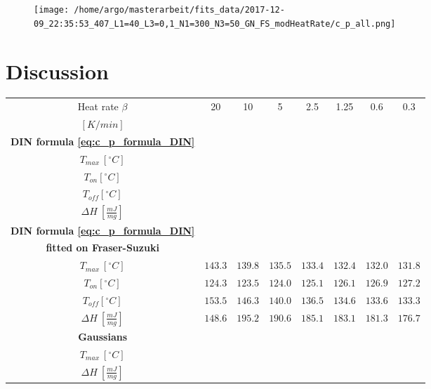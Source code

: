 \documentclass{scrartcl}[12pt, halfparskip]
\numberwithin{equation}{section}
\numberwithin{figure}{section}
\numberwithin{table}{section}
\begin{document}
\begin{figure}[H]
	\centering
	\texttt{[image: /home/argo/masterarbeit/fits\_data/2017-12-09\_22:35:53\_407\_L1=40\_L3=0,1\_N1=300\_N3=50\_GN\_FS\_modHeatRate/c\_p\_all.png]}
	\caption{}
	\label{fig:FS_all_c_p_modHeatRate}
\end{figure}



\section{Discussion}


\begin{table}[H]
	\centering
	\begin{tabular}{| c | c | c | c | c | c | c | c |} \hline
		Heat rate $\beta$ & 20 & 10 & 5 & 2.5 & 1.25 & 0.6 & 0.3 \\
		$[K/min]$ & & & & & & & \\ \hline
		\textbf{DIN formula \cref{eq:c_p_formula_DIN}} & & & & & & & \\[0.7ex]
		$T_{max} \ [^{\circ}C]$ & & & & & & & \\[0.7ex]
		$T_{on} [^{\circ} C]$ & & & & & & & \\[0.7ex]
		$T_{off} [^{\circ} C]$ & & & & & & & \\[0.7ex]
		$\Delta H \ [\frac{mJ}{mg}]$ & & & & & & & \\ \hline

		\textbf{DIN formula \cref{eq:c_p_formula_DIN}} & & & & & & & \\
		\textbf{fitted on Fraser-Suzuki} & & & & & & & \\
		$T_{max} \ [^{\circ}C]$ & $143.3$ & $139.8$ & $135.5$ & $133.4$ & $132.4$ & $132.0$ & $131.8$ \\[0.7ex]
		$T_{on} [^{\circ} C]$ & $124.3$ & $123.5$ & $124.0$ & $125.1$ & $126.1$ & $126.9$ & $127.2$ \\[0.7ex]
		$T_{off} [^{\circ} C]$ & $153.5$ & $146.3$ & $140.0$ & $136.5$ & $134.6$ & $133.6$ & $133.3$ \\[0.7ex]
		$\Delta H \ [\frac{mJ}{mg}]$ & $148.6$ & $195.2$ & $190.6$ & $185.1$ & $183.1$ & $181.3$ & $176.7$ \\ \hline
		
		\textbf{Gaussians} & & & & & & & \\[0.7ex]
		$T_{max} \ [^{\circ}C]$ & & & & & & & \\[0.7ex]
		$\Delta H \ [\frac{mJ}{mg}]$ & & & & & & & \\ \hline
		

\end{tabular}
\end{table}
\end{document}
